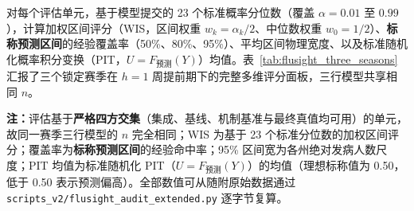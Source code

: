 \documentclass[10pt,a4paper]{article}
\theoremstyle{plain}
\theoremstyle{definition}
\begin{document}
对每个评估单元，基于模型提交的 23 个标准概率分位数（覆盖 $\alpha = 0.01$ 至 $0.99$），计算加权区间评分（WIS\citep{bracher2021evaluating}，区间权重 $w_k = \alpha_k/2$、中位数权重 $w_0 = 1/2$）、\textbf{标称预测区间}的经验覆盖率（50\%、80\%、95\%）、平均区间物理宽度、以及标准随机化概率积分变换（PIT，$U=F_{\text{预测}}(Y)$）均值。表~\ref{tab:flusight_three_seasons} 汇报了三个锁定赛季在 $h=1$ 周提前期下的完整多维评分面板，三行模型共享相同 $n$。

\begin{table}[htbp]
\centering
\small
\caption{CDC FluSight 外部审计评分面板：三个锁定历史赛季（$h=1$ 周）}
\label{tab:flusight_three_seasons}
\resizebox{\textwidth}{!}{%
%
}
\vspace{2pt}
\begin{flushleft}
\scriptsize \textbf{注：}评估基于\textbf{严格四方交集}（集成、基线、机制基准与最终真值均可用）的单元，故同一赛季三行模型的 $n$ 完全相同；WIS 为基于 23 个标准分位数的加权区间评分；覆盖率为\textbf{标称预测区间}的经验命中率；95\% 区间宽为各州绝对发病人数尺度；PIT 均值为标准随机化 PIT（$U=F_{\text{预测}}(Y)$）的均值（理想标称值为 0.50，低于 0.50 表示预测偏高）。全部数值可从随附原始数据通过 \texttt{scripts\_v2/flusight\_audit\_extended.py} 逐字节复算。\end{flushleft}
\end{table}
\end{document}
